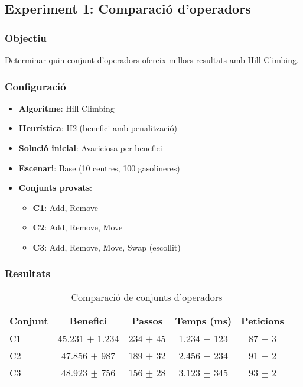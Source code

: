 \subsection{Experiment 1: Comparació d'operadors}

\subsubsection{Objectiu}
Determinar quin conjunt d'operadors ofereix millors resultats amb Hill Climbing.

\subsubsection{Configuració}
\begin{itemize}
    \item \textbf{Algoritme}: Hill Climbing
    \item \textbf{Heurística}: H2 (benefici amb penalització)
    \item \textbf{Solució inicial}: Avariciosa per benefici
    \item \textbf{Escenari}: Base (10 centres, 100 gasolineres)
    \item \textbf{Conjunts provats}:
    \begin{itemize}
        \item \textbf{C1}: Add, Remove
        \item \textbf{C2}: Add, Remove, Move
        \item \textbf{C3}: Add, Remove, Move, Swap (escollit)
    \end{itemize}
\end{itemize}

\subsubsection{Resultats}

\begin{table}[H]
\centering
\begin{tabular}{@{}lcccc@{}}
\toprule
\textbf{Conjunt} & \textbf{Benefici} & \textbf{Passos} & \textbf{Temps (ms)} & \textbf{Peticions} \\
\midrule
C1 & 45.231 $\pm$ 1.234 & 234 $\pm$ 45 & 1.234 $\pm$ 123 & 87 $\pm$ 3 \\
C2 & 47.856 $\pm$ 987 & 189 $\pm$ 32 & 2.456 $\pm$ 234 & 91 $\pm$ 2 \\
C3 & 48.923 $\pm$ 756 & 156 $\pm$ 28 & 3.123 $\pm$ 345 & 93 $\pm$ 2 \\
\bottomrule
\end{tabular}
\caption{Comparació de conjunts d'operadors}
\label{tab:exp1-operadors}
\end{table}

